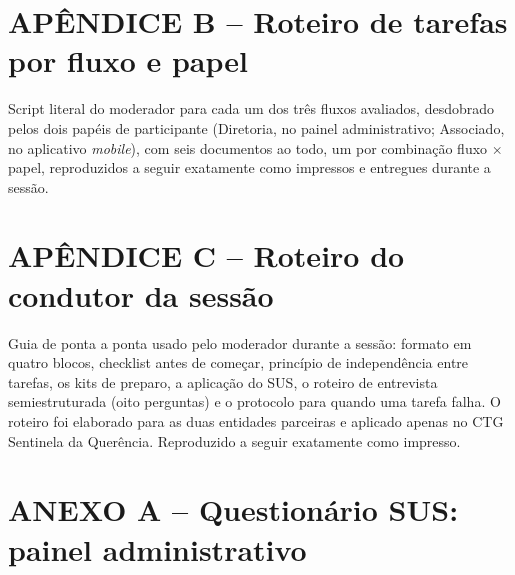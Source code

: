 \documentclass[12pt,a4paper]{article}
\begin{document}


\clearpage
\section*{APÊNDICE B -- Roteiro de tarefas por fluxo e papel}
\makeatletter
\renewcommand{\@currentlabel}{B}
\makeatother
\label{apx:tarefas}

Script literal do moderador para cada um dos três fluxos avaliados, desdobrado pelos dois papéis de
participante (Diretoria, no painel administrativo; Associado, no aplicativo \textit{mobile}), com seis
documentos ao todo, um por combinação fluxo $\times$ papel, reproduzidos a seguir exatamente como
impressos e entregues durante a sessão.








\clearpage
\section*{APÊNDICE C -- Roteiro do condutor da sessão}
\makeatletter
\renewcommand{\@currentlabel}{C}
\makeatother
\label{apx:condutor}

Guia de ponta a ponta usado pelo moderador durante a sessão: formato em quatro blocos, checklist
antes de começar, princípio de independência entre tarefas, os kits de preparo, a aplicação do SUS,
o roteiro de entrevista semiestruturada (oito perguntas) e o protocolo para quando uma tarefa falha.
O roteiro foi elaborado para as duas entidades parceiras e aplicado apenas no CTG Sentinela da
Querência. Reproduzido a seguir exatamente como impresso.



\clearpage
\section*{ANEXO A -- Questionário SUS: painel administrativo}
\makeatletter
\renewcommand{\@currentlabel}{A}
\makeatother
\label{anexo:sus-painel}
\end{document}
